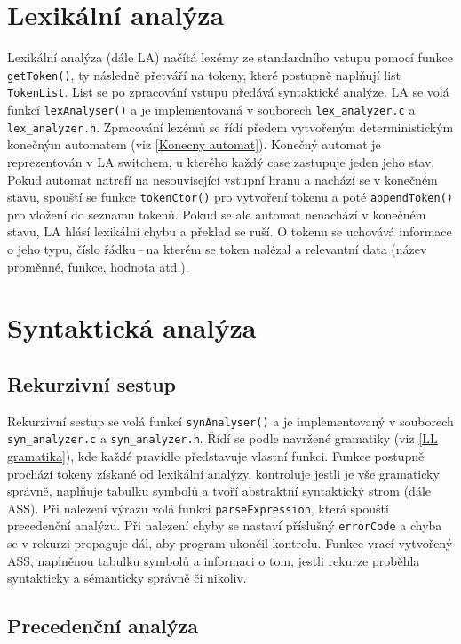 \documentclass[a4paper, 12pt]{article}
\begin{document}
     \section{Lexikální analýza}
    Lexikální analýza (dále LA) načítá lexémy ze standardního vstupu pomocí funkce \texttt{getToken()}, ty následně přetváří na tokeny, které postupně naplňují list \texttt{TokenList}. List se po zpracování vstupu předává syntaktické analýze. LA se volá funkcí \texttt{lexAnalyser()} a je implementovaná v souborech \texttt{lex\_analyzer.c} a \texttt{lex\_analyzer.h}. Zpracování lexémů se řídí předem vytvořeným deterministickým konečným automatem (viz \ref{Konecny automat}). Konečný automat je reprezentován v LA  switchem, u kterého každý case zastupuje jeden jeho stav. Pokud automat natrefí na nesouvisející vstupní hranu a nachází se v konečném stavu, spouští se funkce \texttt{tokenCtor()} pro vytvoření tokenu a poté \texttt{appendToken()} pro vložení do seznamu tokenů. Pokud se ale automat nenachází v konečném stavu, LA hlásí lexikální chybu a překlad se ruší. O tokenu se uchovává informace o jeho typu, číslo řádku\,--\,na kterém se token nalézal a relevantní data (název proměnné, funkce, hodnota atd.).
    \section{Syntaktická analýza}

    \subsection{Rekurzivní sestup} \label{sestup}
        Rekurzivní sestup se volá funkcí \texttt{synAnalyser()} a je implementovaný v souborech \texttt{syn\_analyzer.c} a \texttt{syn\_analyzer.h}. Řídí se podle navržené gramatiky (viz \ref{LL gramatika}), kde každé pravidlo představuje vlastní funkci. Funkce postupně prochází tokeny získané od lexikální analýzy, kontroluje jestli je vše gramaticky správně, naplňuje tabulku symbolů a tvoří abstraktní syntaktický strom (dále ASS). Při nalezení výrazu volá funkci \texttt{parseExpression}, která spouští precedenční analýzu. Při nalezení chyby se nastaví příslušný \texttt{errorCode} a chyba se v rekurzi propaguje dál, aby program ukončil kontrolu. Funkce vrací vytvořený ASS, naplněnou tabulku symbolů a informaci o tom, jestli rekurze proběhla syntakticky a sémanticky správně či nikoliv.

    \subsection{Precedenční analýza}
\end{document}
